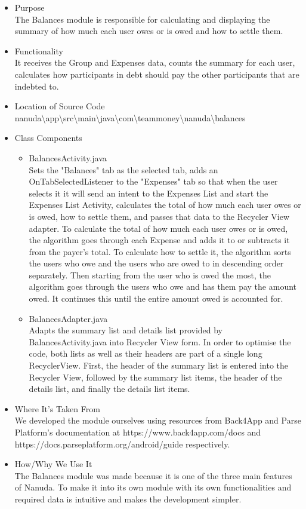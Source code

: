 \documentclass[conference]{IEEEtran}
\begin{document}
\begin{itemize}
    \item Purpose \\ The Balances module is responsible for calculating and displaying the summary of how much each user owes or is owed and how to settle them.
    \item Functionality \\ It receives the Group and Expenses data, counts the summary for each user, calculates how participants in debt should pay the other participants that are indebted to.
    \item Location of Source Code \\ nanuda\textbackslash{}app\textbackslash{}src\textbackslash{}main\textbackslash{}java\textbackslash{}com\textbackslash{}teammoney\textbackslash{}nanuda\textbackslash{}balances
    \item Class Components
        \begin{itemize}
            \item BalancesActivity.java \\ Sets the "Balances" tab as the selected tab, adds an OnTabSelectedListener to the "Expenses" tab so that when the user selects it it will send an intent to the Expenses List and start the Expenses List Activity, calculates the total of how much each user owes or is owed, how to settle them, and passes that data to the Recycler View adapter. To calculate the total of how much each user owes or is owed, the algorithm goes through each Expense and adds it to or subtracts it from the payer's total. To calculate how to settle it, the algorithm sorts the users who owe and the users who are owed to in descending order separately. Then starting from the user who is owed the most, 
            the algorithm goes through the users who owe and has them pay the amount owed. It continues this until the entire amount owed is accounted for.
            \item BalancesAdapter.java \\
            Adapts the summary list and details list provided by BalancesActivity.java into Recycler View form. In order to optimise the code, both lists as well as their headers are part of a single long RecyclerView. First, the header of the summary list is entered into the Recycler View, followed by the summary list items, the header of the details list, and finally the details list items.
        \end{itemize}
    \item Where It's Taken From \\ We developed the module ourselves using resources from Back4App and Parse Platform's documentation at https://www.back4app.com/docs and https://docs.parseplatform.org/android/guide respectively.
    \item How/Why We Use It \\ The Balances module was made because it is one of the three main features of Nanuda. To make it into its own module with its own functionalities and required data is intuitive and makes the development simpler.
\end{itemize}
\end{document}
